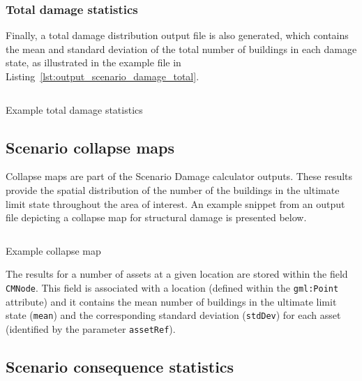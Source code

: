 \subsubsection{Total damage statistics}
\label{subsubsec:scenario_total_damage_statistics}

Finally, a total damage distribution output file is also generated, which
contains the mean and standard deviation of the total number of buildings in
each damage state, as illustrated in the example file in
Listing~\ref{lst:output_scenario_damage_total}.

\begin{listing}[htbp]
  \inputminted[firstline=1,firstnumber=1,fontsize=\footnotesize,frame=single,linenos,bgcolor=lightgray]{xml}{oqum/risk/verbatim/output_scenario_damage_total.xml}
  \caption{Example total damage statistics}
  \label{lst:output_scenario_damage_total}
\end{listing}


\subsection{Scenario collapse maps}
\label{subsec:scenario_collapse_map}

Collapse maps are part of the Scenario Damage calculator outputs. These
results provide the spatial distribution of the number of the buildings in the
ultimate limit state throughout the area of interest. An example snippet from
an output file depicting a collapse map for structural damage is presented
below.

\begin{listing}[htbp]
  \inputminted[firstline=1,firstnumber=1,fontsize=\footnotesize,frame=single,bgcolor=lightgray]{xml}{oqum/risk/verbatim/output_scenario_damage_collapse.xml}
  \caption{Example collapse map}
  \label{lst:output_scenario_damage_collapse}
\end{listing}

The results for a number of \glspl{asset} at a given location are stored
within the field \Verb+CMNode+. This field is associated with a location
(defined within the \Verb+gml:Point+ attribute) and it contains the mean
number of buildings in the ultimate limit state (\Verb+mean+) and the
corresponding standard deviation (\Verb+stdDev+) for each \gls{asset}
(identified by the parameter \Verb+assetRef+).


\subsection{Scenario consequence statistics}
\label{subsec:scenario_consequence_statistics}

